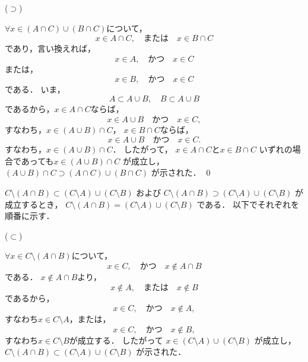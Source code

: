 \documentclass[uplatex,11pt]{jsarticle}
\def\shoumon#1{\vspace{1em}\noindent\ovalbox{\textsf{ #1 }}}
\begin{document}
($\supset$)

$\forall x \in (A \cap C) \cup (B \cap C)$について，
\begin{equation*}
	x \in A \cap C,
	\quad \text{または} \quad
	x \in B \cap C
\end{equation*}
であり，言い換えれば，
\begin{equation*}
	x \in A,
	\quad \text{かつ} \quad
	x \in C
\end{equation*}
または，
\begin{equation*}
	x \in B,
	\quad \text{かつ} \quad
	x \in C
\end{equation*}
である．
いま，
\begin{equation*}
	A \subset A \cup B,
	\quad
	B \subset A \cup B
\end{equation*}
であるから，$x \in A \cap C$ならば，
\begin{equation*}
	x \in A \cup B
	\quad \text{かつ} \quad
	x \in C,
\end{equation*}
すなわち，$x \in (A \cup B) \cap C$，
$x \in B \cap C$ならば，
\begin{equation*}
	x \in A \cup B
	\quad \text{かつ} \quad
	x \in C.
\end{equation*}
すなわち，$x \in (A \cup B) \cap C$．
したがって，
$x \in A \cap C$と$x \in B \cap C$
いずれの場合であっても$x \in (A \cup B) \cap C$
が成立し，
$(A \cup B) \cap C \supset (A \cap C) \cup (B \cap C)$
が示された．
\qed


\shoumon{一般化 De Morgen 律 1}

$C \setminus (A \cap B) \subset (C \setminus A) \cup (C \setminus B)$
および
$C \setminus (A \cap B) \supset (C \setminus A) \cup (C \setminus B)$
が成立するとき，
$C \setminus (A \cap B) = (C \setminus A) \cup (C \setminus B)$
である．
以下でそれぞれを順番に示す．

($\subset$)

$\forall x \in C \setminus (A \cap B)$について，
\begin{equation*}
	x \in  C,
	\quad \text{かつ} \quad
	x \not\in A \cap B
\end{equation*}
である．
$x \not\in A \cap B$より，
\begin{equation*}
	x \not\in A,
	\quad \text{または} \quad
	x \not\in B
\end{equation*}
であるから，
\begin{equation*}
	x \in C,
	\quad \text{かつ} \quad
	x \not\in A,
\end{equation*}
すなわち$x \in C \setminus A$，または，
\begin{equation*}
	x \in C,
	\quad \text{かつ} \quad
	x \not\in B,
\end{equation*}
すなわち$x \in C \setminus B$が成立する．
したがって
$x \in (C \setminus A) \cup (C \setminus B)$
が成立し，
$C \setminus (A \cap B) \subset (C \setminus A) \cup (C \setminus B)$
が示された．
\end{document}

